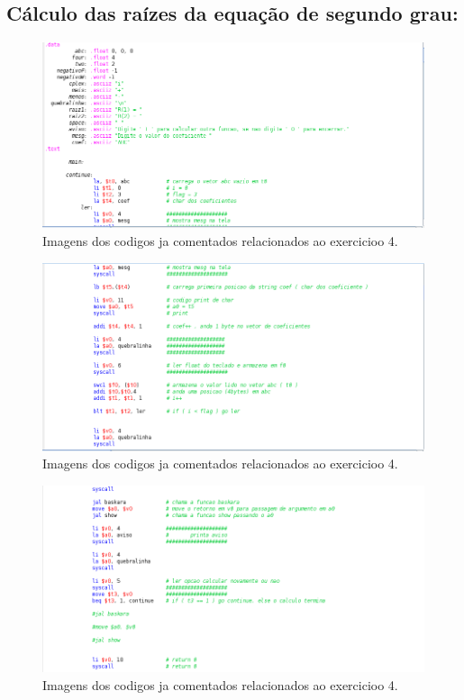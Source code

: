 \documentclass[12pt]{article}
\begin{document}
\subsection{ Cálculo das raízes da equação de segundo grau:}
\label{subsec:sprites}

\begin{figure}[H]
	\centering
	\includegraphics[width=1\textwidth]{EX_4_1.png}
	\caption{Imagens dos codigos ja comentados relacionados ao exercicioo 4.}
\end{figure}

\begin{figure}[H]
	\centering
	\includegraphics[width=1\textwidth]{EX_4_2.png}
	\caption{Imagens dos codigos ja comentados relacionados ao exercicioo 4.}
	\label{fig:hilo}
\end{figure}

\begin{figure}[H]
	\centering
	\includegraphics[width=1\textwidth]{EX_4_3.png}
	\caption{Imagens dos codigos ja comentados relacionados ao exercicioo 4.}
	\label{fig:hilo}
\end{figure}
\end{document}
